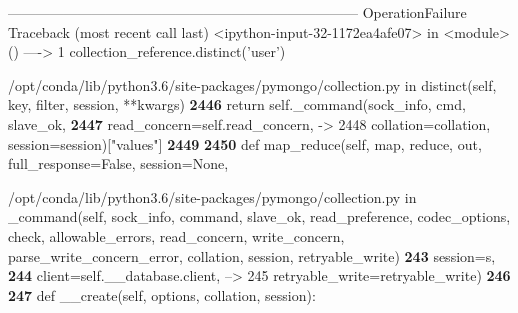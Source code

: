 \documentclass[letterpaper,10pt,english]{sphinxmanual}
\begin{document}
%
\begin{OriginalVerbatim}[commandchars=\\\{\}]
\textcolor{ansi-red}{---------------------------------------------------------------------------}
\textcolor{ansi-red}{OperationFailure}                          Traceback (most recent call last)
\textcolor{ansi-green}{<ipython-input-32-1172ea4afe07>} in \textcolor{ansi-cyan}{<module>}\textcolor{ansi-blue}{()}
\textcolor{ansi-green}{----> 1}\textcolor{ansi-red}{ }collection\_reference\textcolor{ansi-blue}{.}distinct\textcolor{ansi-blue}{(}\textcolor{ansi-blue}{'user'}\textcolor{ansi-blue}{)}

\textcolor{ansi-green}{/opt/conda/lib/python3.6/site-packages/pymongo/collection.py} in \textcolor{ansi-cyan}{distinct}\textcolor{ansi-blue}{(self, key, filter, session, **kwargs)}
\textcolor{ansi-green-intense}{\textbf{   2446}}             return self.\_command(sock\_info, cmd, slave\_ok,
\textcolor{ansi-green-intense}{\textbf{   2447}}                                  read\_concern\textcolor{ansi-blue}{=}self\textcolor{ansi-blue}{.}read\_concern\textcolor{ansi-blue}{,}
\textcolor{ansi-green}{-> 2448}\textcolor{ansi-red}{                                  collation=collation, session=session)["values"]
}\textcolor{ansi-green-intense}{\textbf{   2449}}
\textcolor{ansi-green-intense}{\textbf{   2450}}     def map\_reduce(self, map, reduce, out, full\_response=False, session=None,

\textcolor{ansi-green}{/opt/conda/lib/python3.6/site-packages/pymongo/collection.py} in \textcolor{ansi-cyan}{\_command}\textcolor{ansi-blue}{(self, sock\_info, command, slave\_ok, read\_preference, codec\_options, check, allowable\_errors, read\_concern, write\_concern, parse\_write\_concern\_error, collation, session, retryable\_write)}
\textcolor{ansi-green-intense}{\textbf{    243}}                 session\textcolor{ansi-blue}{=}s\textcolor{ansi-blue}{,}
\textcolor{ansi-green-intense}{\textbf{    244}}                 client\textcolor{ansi-blue}{=}self\textcolor{ansi-blue}{.}\_\_database\textcolor{ansi-blue}{.}client\textcolor{ansi-blue}{,}
\textcolor{ansi-green}{--> 245}\textcolor{ansi-red}{                 retryable\_write=retryable\_write)
}\textcolor{ansi-green-intense}{\textbf{    246}}
\textcolor{ansi-green-intense}{\textbf{    247}}     \textcolor{ansi-green}{def} \_\_create\textcolor{ansi-blue}{(}self\textcolor{ansi-blue}{,} options\textcolor{ansi-blue}{,} collation\textcolor{ansi-blue}{,} session\textcolor{ansi-blue}{)}\textcolor{ansi-blue}{:}


\end{OriginalVerbatim}
\end{document}

